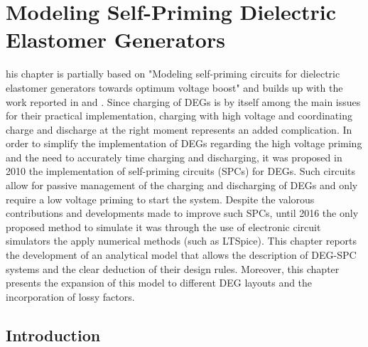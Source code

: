 


\let\textcircled=\pgftextcircled
\chapter{Modeling Self-Priming Dielectric Elastomer Generators}
\label{chap:3}

his chapter is partially based on "Modeling self-priming circuits for dielectric elastomer generators towards optimum voltage boost" and builds up with the work reported in \cite{spcpatrin} and \cite{blablabla}. Since charging of DEGs is by itself among the main issues for their practical implementation, charging with high voltage and coordinating charge and discharge at the right moment represents an added complication. In order to simplify the implementation of DEGs regarding the high voltage priming and the need to accurately time charging and discharging, it was proposed in 2010 the implementation of self-priming circuits (SPCs) for DEGs. Such circuits allow for passive management of the charging and discharging of DEGs and only require a low voltage priming  to start the system. Despite the valorous contributions and developments made to improve such SPCs, until 2016 the only proposed method to simulate it was through the use of electronic circuit simulators the apply numerical methods (such as LTSpice). This chapter reports the development of an analytical model that allows the description of DEG-SPC systems and the clear deduction of their design rules. Moreover, this chapter presents the expansion of this model to different DEG layouts and the incorporation of lossy factors.

\section{Introduction}
\label{sect:intro}  %


